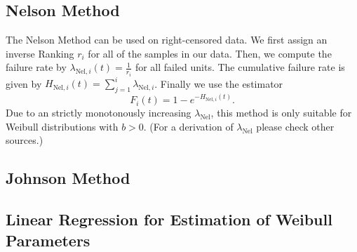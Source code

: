 \subsection{Nelson Method}
The Nelson Method can be used on right-censored data. We first assign an inverse Ranking $r_i$ for all of the samples in our data. Then, we compute the failure rate by $\lambda_{\text{Nel}, i}(t) = \frac{1}{r_i}$ for all failed units. The cumulative failure rate is given by $H_{\text{Nel}, i}(t) = \sum_{j=1}^{i} \lambda_{\text{Nel}, i}$. Finally we use the estimator
$$ F_i(t) = 1 - e^{-H_{\text{Nel}, i}(t)}. $$
Due to an strictly monotonously increasing $\lambda_{\text{Nel}}$, this method is only suitable for Weibull distributions with $b>0$. (For a derivation of $\lambda_{\text{Nel}}$ please check other sources.)

\subsection{Johnson Method}

\subsection{Linear Regression for Estimation of Weibull Parameters}